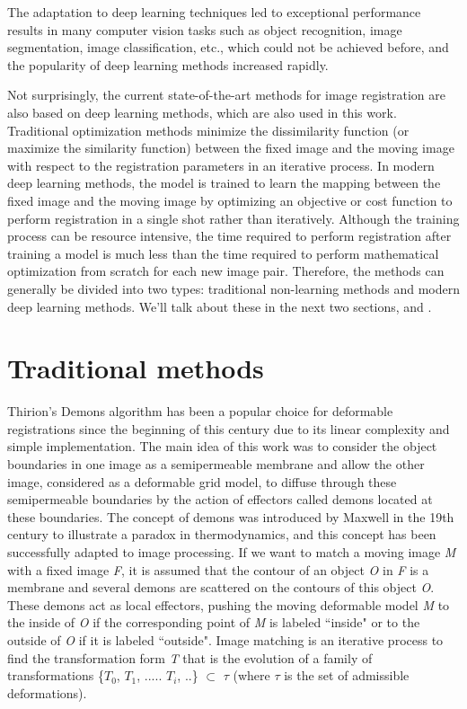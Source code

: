 \documentclass{book}
\begin{document}
	The adaptation to deep learning techniques led to exceptional performance results in many computer vision tasks such as object recognition, image segmentation, image classification, etc., which could not be achieved before, and the popularity of deep learning methods increased rapidly.
	
	Not surprisingly, the current state-of-the-art methods for image registration are also based on deep learning methods, which are also used in this work. Traditional optimization methods minimize the dissimilarity function (or maximize the similarity function) between the fixed image and the moving image with respect to the registration parameters in an iterative process. In modern deep learning methods, the model is trained to learn the mapping between the fixed image and the moving image by optimizing an objective or cost function to perform registration in a single shot rather than iteratively. Although the training process can be resource intensive, the time required to perform registration after training a model is much less than the time required to perform mathematical optimization from scratch for each new image pair. Therefore, the methods can generally be divided into two types: traditional non-learning methods and modern deep learning methods. We'll talk about these in the next two sections,  and .
	
	\section{Traditional methods}
	\label{section:traditional}
	
	Thirion's Demons algorithm \cite{THIRION1998243} has been a popular choice for deformable registrations since the beginning of this century due to its linear complexity and simple implementation. The main idea of this work was to consider the object boundaries in one image as a semipermeable membrane and allow the other image, considered as a deformable grid model, to diffuse through these semipermeable boundaries by the action of effectors called demons located at these boundaries. The concept of demons was introduced by Maxwell in the 19th century to illustrate a paradox in thermodynamics, and this concept has been successfully adapted to image processing. If we want to match a moving image \emph{M} with a fixed image \emph{F}, it is assumed that the contour of an object \emph{O} in \emph{F} is a membrane and several demons are scattered on the contours of this object \emph{O}. These demons act as local effectors, pushing the moving deformable model \emph{M} to the inside of \emph{O} if the corresponding point of \emph{M} is labeled ``inside" or to the outside of \emph{O} if it is labeled ``outside".
	Image matching is an iterative process to find the transformation form \emph{T} that is the  evolution of a family of transformations \{$T_0$, $T_1$, ..... $T_i$, ..\} $\subset$ $\tau$ (where $\tau$ is the set of admissible deformations).
	
\end{document}
